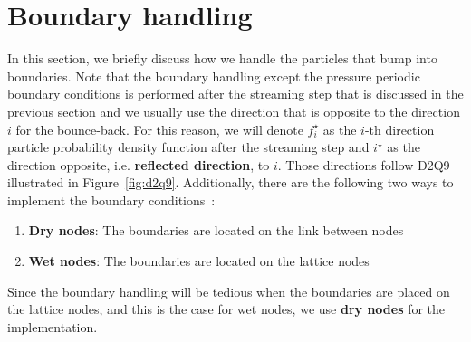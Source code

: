 \section{Boundary handling}\label{boundary-handling-section}
In this section, we briefly discuss how we handle
the particles that bump into boundaries.
Note that the boundary handling
except the pressure periodic boundary conditions
is performed
after the streaming step that is discussed in the previous section
and we usually use the direction that is opposite to
the direction $i$ for the bounce-back.
For this reason, we will denote
$f^\star_i$ as the $i$-th direction
particle probability density function
after the streaming step
and $i^\star$ as the direction opposite,
i.e. {\bf reflected direction}, to $i$.
Those directions follow D2Q9 illustrated
in Figure~\ref{fig:d2q9}.
Additionally, there are the following
two ways to
implement the boundary conditions~\cite{liu2014lattice}:
\begin{enumerate}
  \item {\bf Dry nodes}:
  The boundaries are located on the link between nodes
  \item {\bf Wet nodes}:
  The boundaries are located on the lattice nodes
\end{enumerate}
Since the boundary handling will be tedious when
the boundaries are placed on the lattice nodes,
and this is the case for wet nodes,
we use {\bf dry nodes} for the implementation.

